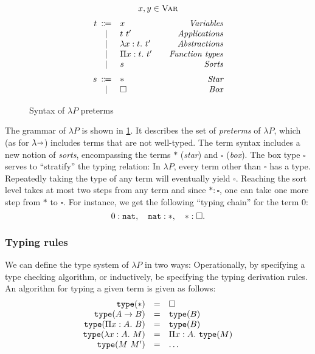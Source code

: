 \begin{figure}[htbp]
    \[
    \begin{array}{r@{\hspace{.5em}}cl@{\hspace{2em}}r}
      \multicolumn{4}{c}{x,y \in \textsc{Var}}\\[2mm]
      t & \Coloneqq & x & \emph{Variables} \\
      & | & t\ t' & \emph{Applications} \\
      & | & \lambda x: t.\ t' & \emph{Abstractions} \\
      & | & \Pi x : t.\ t' & \emph{Function types} \\
      & | & s & \emph{Sorts} \br
      s & \Coloneqq & \ast & \emph{Star} \\
      & | & \square & \emph{Box}
    \end{array}
    \]
    \caption{Syntax of $\lambda P$ preterms}
    \label{fig:dependent-terms-grammar}
\end{figure}

The grammar of $\lambda P$ is shown in \cref{fig:dependent-terms-grammar}.
It describes the set of \emph{preterms} of $\lambda P$, which (as for $\lambda\kern -.25em \shortrightarrow$) includes terms that are not well-typed.
The term syntax includes a new notion of \emph{sorts}, encompassing the terms $\ast$ (\emph{star}) and $\square$ (\emph{box}).
The box type $\square$ serves to ``stratify'' the typing relation:
In $\lambda P$, every term other than $\square$ has a type. Repeatedly taking the type of any term will eventually
yield $\square$.
Reaching the sort level takes at most two steps from any term and since $\ast : \square$, one can take one more step
from $\ast$ to $\square$.
For instance, we get the following ``typing chain'' for the term $0$:
\[ 0 : \verb|nat|,\quad \verb|nat| : \ast,\quad \ast : \square. \]


\subsubsection{Typing rules}
We can define the type system of $\lambda P$ in two ways: Operationally, by specifying a type checking algorithm,
or inductively, be specifying the typing derivation rules.
An algorithm for typing a given term is given as follows:
\[
    \begin{array}{rcl}
        \texttt{type}(\ast) & = & \square \\
        \texttt{type}(A \to B) & = & \texttt{type}(B) \\
        \texttt{type}(\Pi x : A.\ B) & = & \texttt{type}(B) \\
        \texttt{type}(\lambda x : A.\ M) & = & \Pi x : A.\ \texttt{type}(M) \\
        \texttt{type}(M\ M') & = & \hdots
    \end{array}
\]

